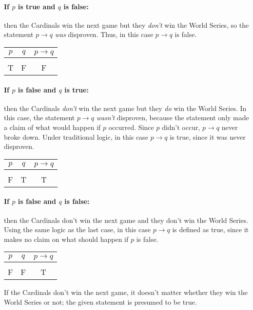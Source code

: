 \paragraph{If $p$ is true and $q$ is false:} then the Cardinals win the next game but they \textit{don't} win the World Series, so the statement $p \to q$ \textit{was} disproven.  Thus, in this case $p \to q$ is false.
\begin{center}
\begin{tabular}{c c c}
$p$ & $q$ & $p \to q$\\
\hline
& & \\
T & F & F
\end{tabular}
\end{center}

\paragraph{If $p$ is false and $q$ is true:} then the Cardinals \textit{don't} win the next game but they \textit{do} win the World Series.  In this case, the statement $p \to q$ \textit{wasn't} disproven, because the statement only made a claim of what would happen if $p$ occurred.  Since $p$ didn't occur, $p \to q$ never broke down.  Under traditional logic, in this case $p \to q$ is true, since it was never disproven.
\begin{center}
\begin{tabular}{c c c}
$p$ & $q$ & $p \to q$\\
\hline
& & \\
F & T & T
\end{tabular}
\end{center}

\paragraph{If $p$ is false and $q$ is false:} then the Cardinals don't win the next game and they don't win the World Series.  Using the same logic as the last case, in this case $p \to q$ is defined as true, since it makes no claim on what should happen if $p$ is false.
\begin{center}
\begin{tabular}{c c c}
$p$ & $q$ & $p \to q$\\
\hline
& & \\
F & F & T
\end{tabular}
\end{center}

If the Cardinals don't win the next game, it doesn't matter whether they win the World Series or not; the given statement is presumed to be true.\\

